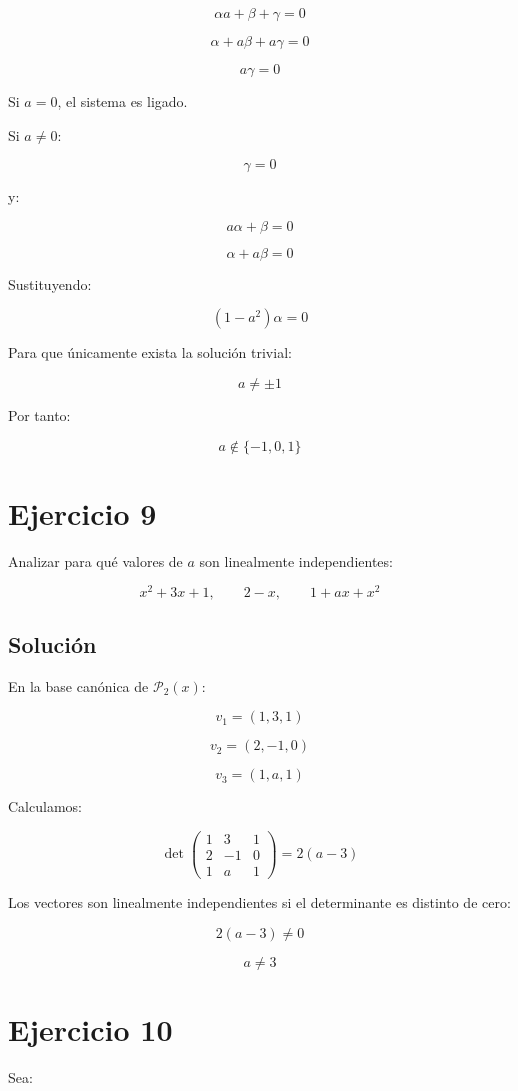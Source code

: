 \documentclass[11pt,a4paper]{article}
\newcommand{\Pn}{\mathcal{P}}
\begin{document}
	\[
	\alpha a+\beta+\gamma=0
	\]

	\[
	\alpha+a\beta+a\gamma=0
	\]

	\[
	a\gamma=0
	\]

	Si $a=0$, el sistema es ligado.

	Si $a\neq0$:

	\[
	\gamma=0
	\]

	y:

	\[
	a\alpha+\beta=0
	\]

	\[
	\alpha+a\beta=0
	\]

	Sustituyendo:

	\[
	(1-a^2)\alpha=0
	\]

	Para que únicamente exista la solución trivial:

	\[
	a\neq\pm1
	\]

	Por tanto:

	\[
	\boxed{
	a\notin\{-1,0,1\}
	}
	\]

\section{Ejercicio 9}
	Analizar para qué valores de $a$ son linealmente independientes:

	\[
	x^2+3x+1,
	\qquad
	2-x,
	\qquad
	1+ax+x^2
	\]

	\subsection{Solución}

	En la base canónica de $\Pn_2(x)$:

	\[
	v_1=(1,3,1)
	\]

	\[
	v_2=(2,-1,0)
	\]

	\[
	v_3=(1,a,1)
	\]

	Calculamos:

	\[
	\det
	\begin{pmatrix}
	1&3&1\\
	2&-1&0\\
	1&a&1
	\end{pmatrix}
	=
	2(a-3)
	\]

	Los vectores son linealmente independientes si el determinante es distinto de cero:

	\[
	2(a-3)\neq0
	\]

	\[
	\boxed{
	a\neq3
	}
	\]

\section{Ejercicio 10}
	Sea:
\end{document}
